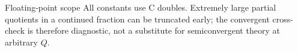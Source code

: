 \documentclass[
  ignorenonframetext,
]{beamer}
\begin{document}
\begin{frame}{Floating-point scope}
\protect{}\label{floating-point-scope}
All constants use C doubles. Extremely large partial quotients in a
continued fraction can be truncated early; the convergent cross-check is
therefore diagnostic, not a substitute for semiconvergent theory at
arbitrary \(Q\).
\end{frame}
\end{document}
